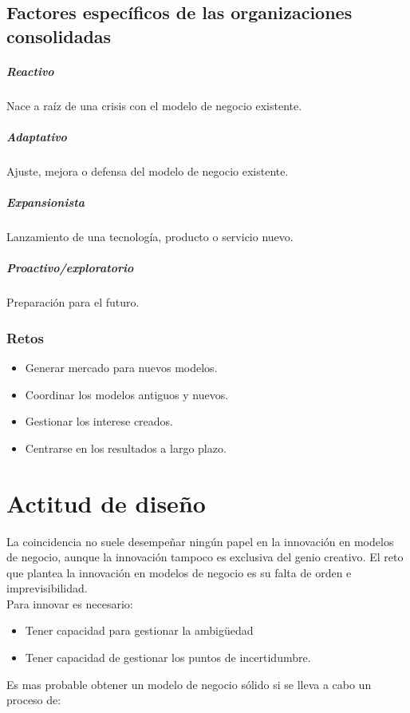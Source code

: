 \documentclass[11pt]{book}
\begin{document}
\section{Factores específicos de las organizaciones consolidadas}
\paragraph{Reactivo}
Nace a raíz de una crisis con el modelo de negocio existente.
\paragraph{Adaptativo}
Ajuste, mejora o defensa del modelo de negocio existente.
\paragraph{Expansionista}
Lanzamiento de una tecnología, producto o servicio nuevo.
\paragraph{Proactivo/exploratorio}
Preparación para el futuro.
\subsection{Retos}
\begin{itemize}
\item Generar mercado para nuevos modelos.
\item Coordinar los modelos antiguos y nuevos.
\item Gestionar los interese creados.
\item Centrarse en los resultados a largo plazo.
\end{itemize}
\chapter{Actitud de diseño}
La coincidencia no suele desempeñar ningún papel en la innovación en modelos de negocio, aunque la innovación tampoco es exclusiva del genio creativo.
El reto que plantea la innovación en modelos de negocio es su falta de orden e imprevisibilidad.
\\ Para innovar es necesario:
\begin{itemize}
\item  Tener capacidad para gestionar la ambigüedad 
\item Tener capacidad de gestionar los puntos de incertidumbre.
\end{itemize}
Es mas probable obtener un modelo de negocio sólido si se lleva a cabo un proceso de:
\end{document}
